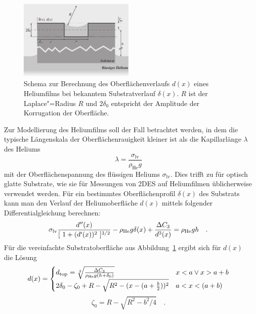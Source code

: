 \begin{figure}[h!tbp]
	\includegraphics[width=0.5\textwidth]{theo_zweikomponenten/simple_surface}%
	\hfill%
	\begin{minipage}[b]{0.5\textwidth-\tabcolsep}
		\caption[Schema zur Berechnung des Verlaufs der Oberfläche des Heliumfilms]{Schema zur Berechnung des Oberflächenverlaufs $d(x)$ eines Heliumfilms bei bekanntem Substratverlauf $\delta(x)$. $R$ ist der Laplace"=Radius $R$ und $2\delta_0$ entspricht der Amplitude der Korrugation der Oberfläche.}
		\label{fig:simple_surface}
	\end{minipage}
\end{figure}
Zur Modellierung des Heliumfilms soll der Fall betrachtet werden, in dem die typische Längenskala der Oberflächenrauigkeit kleiner ist als die Kapillarlänge $\lambda$ des Heliums
	\begin{equation}
		\lambda=\frac{\sigma_\text{lv}}{\rho_\text{He} g}
	\end{equation}
mit der Oberflächenspannung des flüssigen Heliums $\sigma_\text{lv}$. Dies trifft zu für optisch glatte Substrate, wie sie für Messungen von 2DES auf Heliumfilmen üblicherweise verwendet werden. Für ein bestimmtes Oberflächenprofil $\delta(x)$ des Substrats kann man den Verlauf der Heliumoberfläche $d(x)$ mittels folgender Differentialgleichung berechnen:
	\begin{equation}
		\sigma_\text{lv}\frac{d''(x)}{[~1+(d'(x))^2~]^{3/2}} - \rho_\text{He} g
	        \delta(x) + \frac{\Delta C_3}{d^3(x)} = \rho_\text{He} g h\quad.
	\end{equation}
Für die vereinfachte Substratoberfläche aus Abbildung~\ref{fig:simple_surface} ergibt sich für $d(x)$ die Lösung
	\begin{equation}
		d(x)=
		\begin{cases}
			d_\text{top}=\sqrt[3]{\frac{\Delta C_3}{\rho_\text{He} g(h+\delta_0)}}&x<a\vee x>a+b\\
			2\delta_0-\zeta_0+R-\sqrt{R^2-(x-(a+\frac{b}2))^2}&a<x<(a+b)\\
		\end{cases}
	\end{equation}
	\begin{equation}
		\zeta_0=R-\sqrt{R^2-b^2/4}\quad.
	\end{equation}

